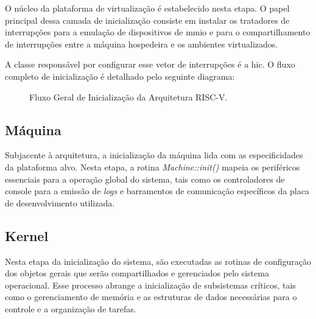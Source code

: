 O núcleo da plataforma de virtualização é estabelecido nesta etapa. O papel principal dessa camada de inicialização consiste em instalar os
tratadores de interrupções para a emulação de dispositivos de \gls{mmio} e para o compartilhamento de interrupções entre a máquina hospedeira e os ambientes virtualizados.

A classe responsável por configurar esse vetor de interrupções é a \gls{hic}. O fluxo completo de inicialização é detalhado pelo seguinte diagrama:

\vspace{1cm}

\begin{figure}[htbp]
	\begin{center}
	\end{center}
	\caption{Fluxo Geral de Inicialização da Arquitetura RISC-V.}
\end{figure}


\subsection{Máquina}

Subjacente à arquitetura, a inicialização da máquina lida com as especificidades da plataforma alvo.
Nesta etapa, a rotina \textit{Machine::init()} mapeia os periféricos essenciais para a operação global do sistema,
tais como os controladores de console para a emissão de \textit{logs} e barramentos de comunicação específicos da placa de
desenvolvimento utilizada.

\subsection{Kernel}

Nesta etapa da inicialização do sistema, são executadas as rotinas de configuração dos objetos gerais que serão
compartilhados e gerenciados pelo sistema operacional. Esse processo abrange a inicialização de subsistemas críticos,
tais como o gerenciamento de memória e as estruturas de dados necessárias para o controle e a organização de tarefas.

